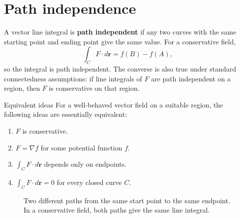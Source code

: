 \documentclass[11pt,oneside]{book}
\newcommand{\vect}[1]{\mathbf{#1}}
\newcommand{\grad}{\nabla}
\begin{document}
\section{Path independence}

A vector line integral is \textbf{path independent} if any two curves with the same starting point and ending point give the same value. For a conservative field,
\[
\int_C F\cdot d\vect r=f(B)-f(A),
\]
so the integral is path independent. The converse is also true under standard connectedness assumptions: if line integrals of $F$ are path independent on a region, then $F$ is conservative on that region.

\begin{definitionbox}{Equivalent ideas}
For a well-behaved vector field on a suitable region, the following ideas are essentially equivalent:
\begin{enumerate}
  \item $F$ is conservative.
  \item $F=\grad f$ for some potential function $f$.
  \item $\int_C F\cdot d\vect r$ depends only on endpoints.
  \item $\int_C F\cdot d\vect r=0$ for every closed curve $C$.
\end{enumerate}
\end{definitionbox}

\begin{figure}[H]
\centering
{}
\caption{Two different paths from the same start point to the same endpoint. In a conservative field, both paths give the same line integral.}
\end{figure}
\end{document}
